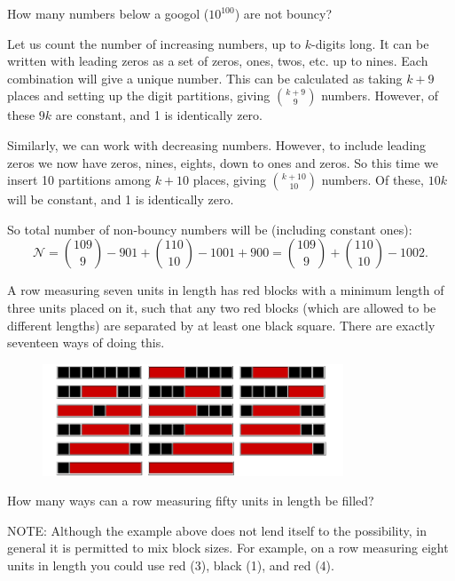 How many numbers below a googol ($10^{100}$) are not bouncy?

Let us count the number of increasing numbers, up to $k$-digits long.  It can be written with leading zeros as a set of zeros, ones, twos, etc. up to nines.  Each combination will give a unique number.  This can be calculated as taking $k+9$ places and setting up the digit partitions, giving $\binom{k+9}{9}$ numbers.  However, of these $9k$ are constant, and 1 is identically zero.

Similarly, we can work with decreasing numbers.  However, to include leading zeros we now have zeros, nines, eights, down to ones and zeros.  So this time we insert 10 partitions among $k+10$ places, giving $\binom{k+10}{10}$ numbers.  Of these, $10k$ will be constant, and 1 is identically zero.

So total number of non-bouncy numbers will be (including constant ones):
$$\mathcal{N} = \binom{109}{9} - 901 + \binom{110}{10} - 1001 + 900 = \binom{109}{9} + \binom{110}{10} - 1002.$$




A row measuring seven units in length has red blocks with a minimum length of three units placed on it, such that any two red blocks (which are allowed to be different lengths) are separated by at least one black square. There are exactly seventeen ways of doing this.
\vspace{-0.5cm}
\begin{center}
\begin{figure}[h]
\centering
\includegraphics[width = 0.80\textwidth]{./images/p_114.png}
\end{figure}
\end{center}
\vspace{-1.25cm}
How many ways can a row measuring fifty units in length be filled?

\footnotesize
NOTE: Although the example above does not lend itself to the possibility, in general it is permitted to mix block sizes. For example, on a row measuring eight units in length you could use red (3), black (1), and red (4).

